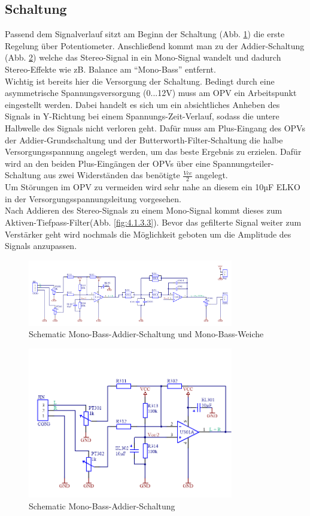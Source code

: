 \subsection{Schaltung}\label{subsec:4.1.3}
Passend dem Signalverlauf sitzt am Beginn der Schaltung (Abb. \ref{fig:4.1.3.1}) die erste Regelung über Potentiometer. Anschließend kommt man zu der Addier-Schaltung (Abb. \ref{fig:4.1.3.2}) welche das Stereo-Signal in ein Mono-Signal wandelt und dadurch Stereo-Effekte wie zB. Balance am \enquote{Mono-Bass} entfernt.\\
Wichtig ist bereits hier die Versorgung der Schaltung. Bedingt durch eine asymmetrische Spannungsversorgung (0...12V) muss am OPV ein Arbeitspunkt eingestellt werden. Dabei handelt es sich um ein absichtliches Anheben des Signals in Y-Richtung bei einem Spannungs-Zeit-Verlauf, sodass die untere Halbwelle des Signals nicht verloren geht. Dafür muss am Plus-Eingang des OPVs der Addier-Grundschaltung und der Butterworth-Filter-Schaltung die halbe Versorgungsspannung angelegt werden, um das beste Ergebnis zu erzielen. Dafür wird an den beiden Plus-Eingängen der OPVs über eine Spannungsteiler-Schaltung aus zwei Widerständen das benötigte $\frac{Vcc}{2}$ angelegt.\\
Um Störungen im OPV zu vermeiden wird sehr nahe an diesem ein 10µF ELKO in der Versorgungsspannungsleitung vorgesehen.\\
Nach Addieren des Stereo-Signals zu einem Mono-Signal kommt dieses zum Aktiven-Tiefpass-Filter(Abb. \ref{fig:4.1.3.3}). Bevor das gefilterte Signal weiter zum Verstärker geht wird nochmals die Möglichkeit geboten um die Amplitude des Signals anzupassen.
\begin{figure} [H]
	\centering
	\includegraphics[width=0.8\textwidth]{img/Print3/3mTTWeicheruAddiererDiplSchematic.PNG}
	\caption{Schematic Mono-Bass-Addier-Schaltung und Mono-Bass-Weiche}
	\label {fig:4.1.3.1}
\end{figure}
\begin{figure} [H]
	\centering
	\includegraphics[width=0.8\textwidth]{img/Print3/3mTTWeicheruAddiererDiplSchematicTeil1.png}
	\caption{Schematic Mono-Bass-Addier-Schaltung}
	\label {fig:4.1.3.2}
\end{figure}
